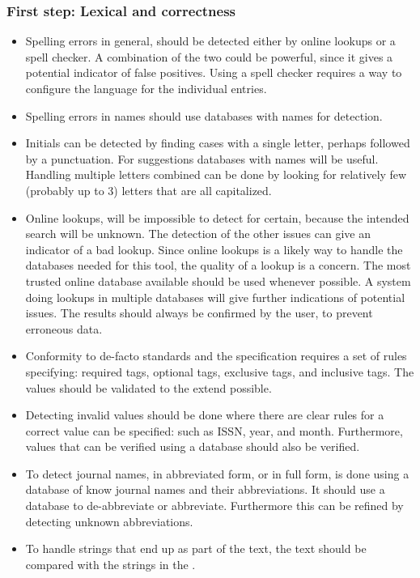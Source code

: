 \subsubsection{First step: Lexical and correctness}
\begin{itemize}
\item Spelling errors in general, should be detected either by online
  lookups or a spell checker.  A combination of the two could be
  powerful, since it gives a potential indicator of false positives.
  Using a spell checker requires a way to configure the language for
  the individual entries.

\item Spelling errors in names should use databases with names for
  detection.

\item Initials can be detected by finding cases with a single letter,
  perhaps followed by a punctuation.  For suggestions databases with
  names will be useful.  Handling multiple letters combined can be
  done by looking for relatively few (probably up to 3) letters that
  are all capitalized.

\item Online lookups, will be impossible to detect for certain,
  because the intended search will be unknown.  The detection of the
  other issues can give an indicator of a bad lookup.  Since online
  lookups is a likely way to handle the databases needed for this
  tool, the quality of a lookup is a concern.  The most trusted online
  database available should be used whenever possible.  A system doing
  lookups in multiple databases will give further indications of
  potential issues.  The results should always be confirmed by the
  user, to prevent erroneous data.

\item Conformity to de-facto standards and the {\bibtex} specification
  requires a set of rules specifying: required tags, optional tags,
  exclusive tags, and inclusive tags.  The values should be validated
  to the extend possible.

\item Detecting invalid values should be done where there are clear
  rules for a correct value can be specified: such as ISSN, year, and
  month.  Furthermore, values that can be verified using a database
  should also be verified.

\item To detect journal names, in abbreviated form, or in full form,
  is done using a database of know journal names and their
  abbreviations.  It should use a database to de-abbreviate or
  abbreviate.  Furthermore this can be refined by detecting unknown
  abbreviations.

\item To handle {\bibtex} strings that end up as part of the text, the
  text should be compared with the strings in the .
\end{itemize}


